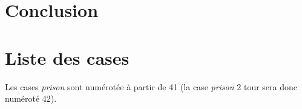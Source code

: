 \documentclass[letterpaper]{article}
\begin{document}


\section{Conclusion}


\footnotesize
\nocite{*}




\newpage
\appendix
  \onecolumn

  \section{Liste des cases}
    \label{liste_case}
    Les cases \textit{prison} sont numérotée à partir de 41 (la case \textit{prison} 2 tour sera donc numéroté 42).\\
\end{document}
